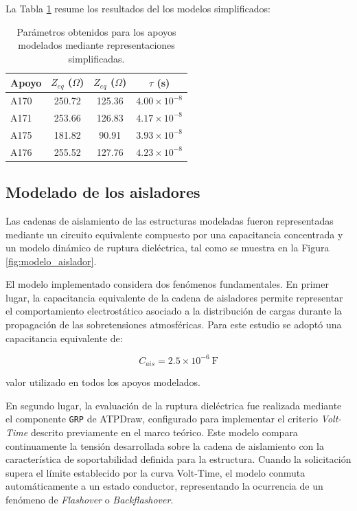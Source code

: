 \documentclass[12pt,letterpaper]{article}
\begin{document}
La Tabla \ref{tab:modelos_simplificados} resume los resultados del los modelos simplificados:

\begin{table}[H]
\centering
\caption{Parámetros obtenidos para los apoyos modelados mediante representaciones simplificadas.}
\label{tab:modelos_simplificados}
\renewcommand{\arraystretch}{1.2}
\begin{tabular}{lccc}
\toprule
Apoyo & $Z_{eq}$ ($\Omega$) & $Z_{eq}$ ($\Omega$) & $\tau$ (s) \\
\midrule
A170 & 250.72 & 125.36 & $4.00\times10^{-8}$ \\
A171 & 253.66 & 126.83 & $4.17\times10^{-8}$ \\
A175 & 181.82 & 90.91 & $3.93\times10^{-8}$ \\
A176 & 255.52 & 127.76 & $4.23\times10^{-8}$ \\
\bottomrule
\end{tabular}
\end{table}

\subsection{Modelado de los aisladores}

Las cadenas de aislamiento de las estructuras modeladas fueron representadas mediante un circuito equivalente compuesto por una capacitancia concentrada y un modelo dinámico de ruptura dieléctrica, tal como se muestra en la Figura \ref{fig:modelo_aislador}.

El modelo implementado considera dos fenómenos fundamentales. En primer lugar, la capacitancia equivalente de la cadena de aisladores permite representar el comportamiento electrostático asociado a la distribución de cargas durante la propagación de las sobretensiones atmosféricas. Para este estudio se adoptó una capacitancia equivalente de:

\begin{equation}
C_{ais}=2.5\times10^{-6}\ \mathrm{F}
\end{equation}

valor utilizado en todos los apoyos modelados.

En segundo lugar, la evaluación de la ruptura dieléctrica fue realizada mediante el componente \texttt{GRP} de ATPDraw, configurado para implementar el criterio \textit{Volt-Time} descrito previamente en el marco teórico. Este modelo compara continuamente la tensión desarrollada sobre la cadena de aislamiento con la característica de soportabilidad definida para la estructura. Cuando la solicitación supera el límite establecido por la curva Volt-Time, el modelo conmuta automáticamente a un estado conductor, representando la ocurrencia de un fenómeno de \textit{Flashover} o \textit{Backflashover}.
\end{document}
